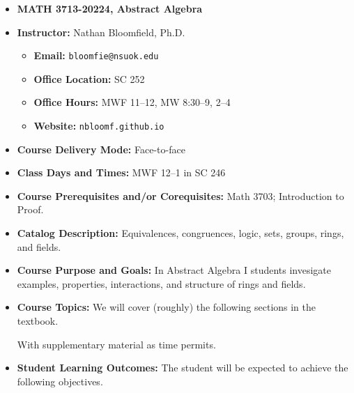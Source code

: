 \documentclass{article}
\begin{document}
\begin{itemize}
\item[] \textbf{\Large MATH 3713-20224, Abstract Algebra}

\item \textbf{Instructor:} Nathan Bloomfield, Ph.D.
\begin{itemize}
\item[] \textbf{Email:} \texttt{bloomfie@nsuok.edu}
\item[] \textbf{Office Location:} SC 252 
\item[] \textbf{Office Hours:} MWF 11--12, MW 8:30--9, 2--4
\item[] \textbf{Website:} \texttt{nbloomf.github.io}
\end{itemize}


\item \textbf{Course Delivery Mode:} Face-to-face


\item \textbf{Class Days and Times:} MWF 12--1 in SC 246


\item \textbf{Course Prerequisites and/or Corequisites:} Math 3703; Introduction to Proof.


\item \textbf{Catalog Description:} Equivalences, congruences, logic, sets, groups, rings, and fields.


\item \textbf{Course Purpose and Goals:} In Abstract Algebra I students invesigate examples, properties, interactions, and structure of rings and fields.


\item \textbf{Course Topics:} We will cover (roughly) the following sections in the textbook.
With supplementary material as time permits.


\item \textbf{Student Learning Outcomes:} The student will be expected to achieve the following objectives.



\end{itemize}
\end{document}
